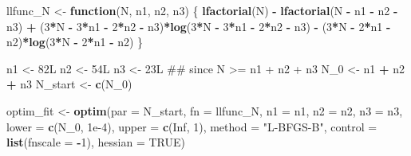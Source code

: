 \documentclass[]{article}
\newenvironment{Shaded}{\begin{snugshade}}{\end{snugshade}}
\newcommand{\KeywordTok}[1]{\textcolor[rgb]{0.13,0.29,0.53}{\textbf{#1}}}
\newcommand{\DataTypeTok}[1]{\textcolor[rgb]{0.13,0.29,0.53}{#1}}
\newcommand{\DecValTok}[1]{\textcolor[rgb]{0.00,0.00,0.81}{#1}}
\newcommand{\FloatTok}[1]{\textcolor[rgb]{0.00,0.00,0.81}{#1}}
\newcommand{\StringTok}[1]{\textcolor[rgb]{0.31,0.60,0.02}{#1}}
\newcommand{\OtherTok}[1]{\textcolor[rgb]{0.56,0.35,0.01}{#1}}
\newcommand{\ControlFlowTok}[1]{\textcolor[rgb]{0.13,0.29,0.53}{\textbf{#1}}}
\newcommand{\OperatorTok}[1]{\textcolor[rgb]{0.81,0.36,0.00}{\textbf{#1}}}
\newcommand{\NormalTok}[1]{#1}
\begin{document}
\begin{Shaded}
\begin{Highlighting}[]
\NormalTok{llfunc_N <-}\StringTok{ }\ControlFlowTok{function}\NormalTok{(N, n1, n2, n3) \{}
  \KeywordTok{lfactorial}\NormalTok{(N) }\OperatorTok{-}\StringTok{ }\KeywordTok{lfactorial}\NormalTok{(N }\OperatorTok{-}\StringTok{ }\NormalTok{n1 }\OperatorTok{-}\StringTok{ }\NormalTok{n2 }\OperatorTok{-}\StringTok{ }\NormalTok{n3) }\OperatorTok{+}
\StringTok{    }\NormalTok{(}\DecValTok{3}\OperatorTok{*}\NormalTok{N }\OperatorTok{-}\StringTok{ }\DecValTok{3}\OperatorTok{*}\NormalTok{n1 }\OperatorTok{-}\StringTok{ }\DecValTok{2}\OperatorTok{*}\NormalTok{n2 }\OperatorTok{-}\StringTok{ }\NormalTok{n3)}\OperatorTok{*}\KeywordTok{log}\NormalTok{(}\DecValTok{3}\OperatorTok{*}\NormalTok{N }\OperatorTok{-}\StringTok{ }\DecValTok{3}\OperatorTok{*}\NormalTok{n1 }\OperatorTok{-}\StringTok{ }\DecValTok{2}\OperatorTok{*}\NormalTok{n2 }\OperatorTok{-}\StringTok{ }\NormalTok{n3) }\OperatorTok{-}
\StringTok{    }\NormalTok{(}\DecValTok{3}\OperatorTok{*}\NormalTok{N }\OperatorTok{-}\StringTok{ }\DecValTok{2}\OperatorTok{*}\NormalTok{n1 }\OperatorTok{-}\StringTok{ }\NormalTok{n2)}\OperatorTok{*}\KeywordTok{log}\NormalTok{(}\DecValTok{3}\OperatorTok{*}\NormalTok{N }\OperatorTok{-}\StringTok{ }\DecValTok{2}\OperatorTok{*}\NormalTok{n1 }\OperatorTok{-}\StringTok{ }\NormalTok{n2)}
\NormalTok{\}}

\NormalTok{n1 <-}\StringTok{ }\NormalTok{82L}
\NormalTok{n2 <-}\StringTok{ }\NormalTok{54L}
\NormalTok{n3 <-}\StringTok{ }\NormalTok{23L}
\NormalTok{## since N >= n1 + n2 + n3}
\NormalTok{N_}\DecValTok{0}\NormalTok{ <-}\StringTok{ }\NormalTok{n1 }\OperatorTok{+}\StringTok{ }\NormalTok{n2 }\OperatorTok{+}\StringTok{ }\NormalTok{n3}
\NormalTok{N_start <-}\StringTok{ }\KeywordTok{c}\NormalTok{(N_}\DecValTok{0}\NormalTok{)}

\NormalTok{optim_fit <-}\StringTok{ }\KeywordTok{optim}\NormalTok{(}\DataTypeTok{par =}\NormalTok{ N_start,}
                   \DataTypeTok{fn =}\NormalTok{ llfunc_N,}
                   \DataTypeTok{n1 =}\NormalTok{ n1, }\DataTypeTok{n2 =}\NormalTok{ n2, }\DataTypeTok{n3 =}\NormalTok{ n3,}
                   \DataTypeTok{lower =} \KeywordTok{c}\NormalTok{(N_}\DecValTok{0}\NormalTok{, }\FloatTok{1e-4}\NormalTok{),}
                   \DataTypeTok{upper =} \KeywordTok{c}\NormalTok{(}\OtherTok{Inf}\NormalTok{, }\DecValTok{1}\NormalTok{),}
                   \DataTypeTok{method =} \StringTok{"L-BFGS-B"}\NormalTok{,}
                   \DataTypeTok{control =} \KeywordTok{list}\NormalTok{(}\DataTypeTok{fnscale =} \OperatorTok{-}\DecValTok{1}\NormalTok{),}
                   \DataTypeTok{hessian =} \OtherTok{TRUE}\NormalTok{)}


\end{Highlighting}
\end{Shaded}
\end{document}
